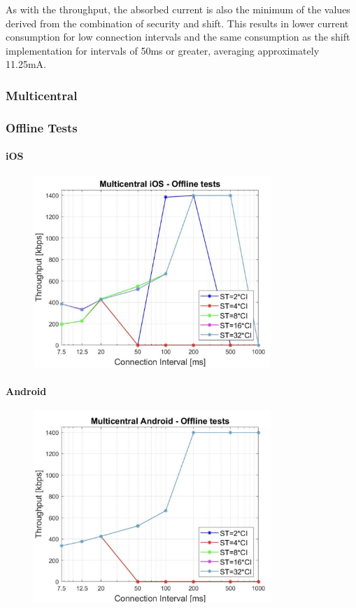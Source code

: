 \documentclass{Configuration_Files/PoliMi3i_thesis}
\begin{document}
As with the throughput, the absorbed current is also the minimum of the values derived from the combination of security and shift. This results in lower current consumption for low connection intervals and the same consumption as the shift implementation for intervals of 50ms or greater, averaging approximately 11.25mA.

\subsubsection*{Multicentral}
\subsubsection*{Offline Tests}
\paragraph{iOS}

\begin{figure}[H]
    \centering
    \includegraphics[width=0.8\textwidth]{Results Manuel/figure25}
    \label{fig:figure1}
\end{figure}

\paragraph{Android}

\begin{figure}[H]
    \centering
    \includegraphics[width=0.8\textwidth]{Results Manuel/figure26}
    \label{fig:figure1}
\end{figure}
\end{document}
